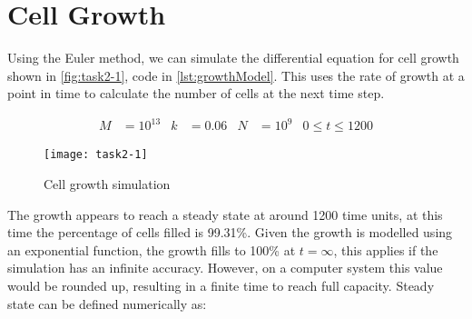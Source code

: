 \section{Cell Growth}











Using the Euler method, we can simulate the differential equation for cell growth shown in \autoref{fig:task2-1},
code in \autoref{lst:growthModel}.
This uses the rate of growth at a point in time to calculate the number of cells at the next time step.

\setlength{\belowdisplayskip}{0pt} \setlength{\belowdisplayshortskip}{0pt}
\setlength{\abovedisplayskip}{0pt} \setlength{\abovedisplayshortskip}{0pt}

\begin{align*}
    M &= 10^{13} & k &= 0.06 & N &= 10^9 & 0 \leq t \leq 1200
\end{align*}

\begin{figure}[ht]
    \centering
    \texttt{[image: task2-1]}
    \caption[Cell growth simulation]{Cell growth simulation}
    \label{fig:task2-1}
\end{figure}

The growth appears to reach a steady state at around 1200 time units, at this time the percentage of cells filled is 99.31\%.
Given the growth is modelled using an exponential function, the growth fills to 100\% at $t = \infty$,
this applies if the simulation has an infinite accuracy.
However, on a computer system this value would be rounded up, resulting in a finite time to reach full capacity.
Steady state can be defined numerically as:

